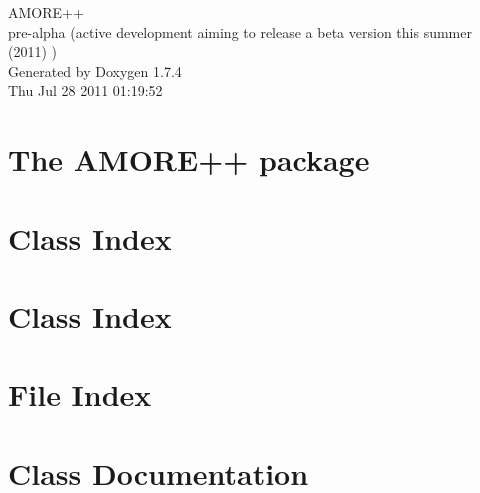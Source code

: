 \documentclass[a4paper]{book}
\begin{document}
\hypersetup{pageanchor=false}
\begin{titlepage}
\vspace*{7cm}
\begin{center}
{\Large AMORE++ \\[1ex]\large pre-\/alpha (active development aiming to release a beta version this summer (2011) ) }\\
\vspace*{1cm}
{\large Generated by Doxygen 1.7.4}\\
\vspace*{0.5cm}
{\small Thu Jul 28 2011 01:19:52}\\
\end{center}
\end{titlepage}
\clearemptydoublepage
{}
\tableofcontents
\clearemptydoublepage
{}
\hypersetup{pageanchor=true}
\chapter{The AMORE++ package}
\label{index}\hypertarget{index}{}
\chapter{Class Index}

\chapter{Class Index}

\chapter{File Index}

\chapter{Class Documentation}




















































\end{document}
